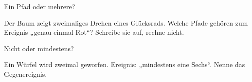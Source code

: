 \setcounter{aufgabe}{16}

\begin{aufgabe}{Ein Pfad oder mehrere?}
\begin{teile}
\teil Der Baum zeigt zweimaliges Drehen eines Glücksrads. Welche Pfade gehören zum Ereignis „genau einmal Rot“? Schreibe sie auf, rechne nicht.

\end{teile}
\end{aufgabe}

\begin{aufgabe}{Nicht oder mindestens?}
\begin{teile}
\teil Ein Würfel wird zweimal geworfen. Ereignis: „mindestens eine Sechs“. Nenne das Gegenereignis.
\end{teile}
\end{aufgabe}

